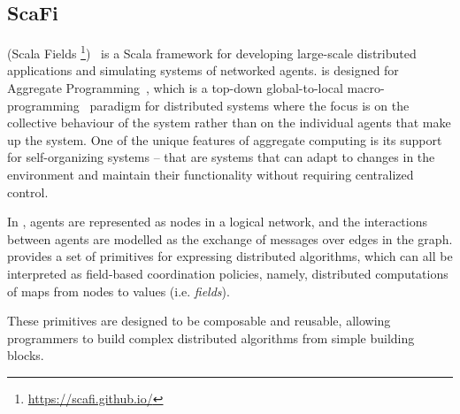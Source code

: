 \subsection{ScaFi}\label{scafi}

\scafi{} (Scala Fields \footnote{\url{https://scafi.github.io/}})~\cite{Casadei2022} 
 is a Scala framework for developing large-scale 
 distributed applications and simulating systems of networked agents.
%
\scafi{} is designed for Aggregate Programming~\cite{Beal2015}, 
 which is a top-down global-to-local 
 macro-programming~\cite{Casadei2023} paradigm for distributed systems 
 where the focus is on the collective behaviour of the system 
 rather than on the individual agents that make up the system.
%
One of the unique features of aggregate computing 
 is its support for self-organizing systems -- that are systems 
 that can adapt to changes in the environment and 
 maintain their functionality without requiring centralized control.

In \scafi{}, agents are represented as nodes in a logical network, 
 and the interactions between agents are modelled 
 as the exchange of messages over edges in the graph.
%
\scafi{} provides a set of primitives for expressing distributed
algorithms, 
 which can all be interpreted as field-based coordination policies, namely, 
 distributed computations of maps from nodes to values (i.e. \emph{fields}).
 
  These primitives are designed to be composable and reusable, 
 allowing programmers to build complex distributed algorithms from simple building blocks.
%


